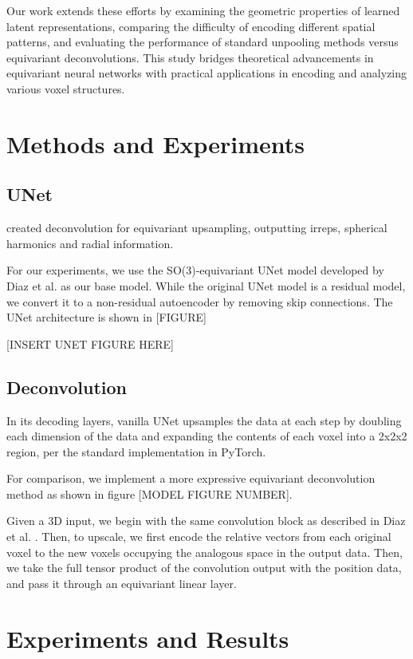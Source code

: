 \documentclass[letterpaper]{article}
\begin{document}
Our work extends these efforts by examining the geometric properties of learned latent representations, comparing the difficulty of encoding different spatial patterns, and evaluating the performance of standard unpooling methods versus equivariant deconvolutions. This study bridges theoretical advancements in equivariant neural networks with practical applications in encoding and analyzing various voxel structures.

\section{Methods and Experiments}
\subsection{UNet}  created deconvolution for equivariant upsampling, outputting irreps, spherical harmonics and radial information.

For our experiments, we use the SO(3)-equivariant UNet model developed by Diaz et al. \cite{e3nn_medical} as our base model. While the original UNet model is a residual model, we convert it to a non-residual autoencoder by removing skip connections. The UNet architecture is shown in [FIGURE]

[INSERT UNET FIGURE HERE]

\subsection{Deconvolution}
In its decoding layers, vanilla UNet upsamples the data at each step by doubling each dimension of the data and expanding the contents of each voxel into a 2x2x2 region, per the standard implementation in PyTorch. %

For comparison, we implement a more expressive equivariant deconvolution method as shown in figure [MODEL FIGURE NUMBER].

Given a 3D input, we begin with the same convolution block as described in Diaz et al. \cite{e3nn_medical}. Then, to upscale, we first encode the relative vectors from each original voxel to the new voxels occupying the analogous space in the output data. Then, we take the full tensor product of the convolution output with the position data, and pass it through an equivariant linear layer.

\section{Experiments and Results}
\end{document}
